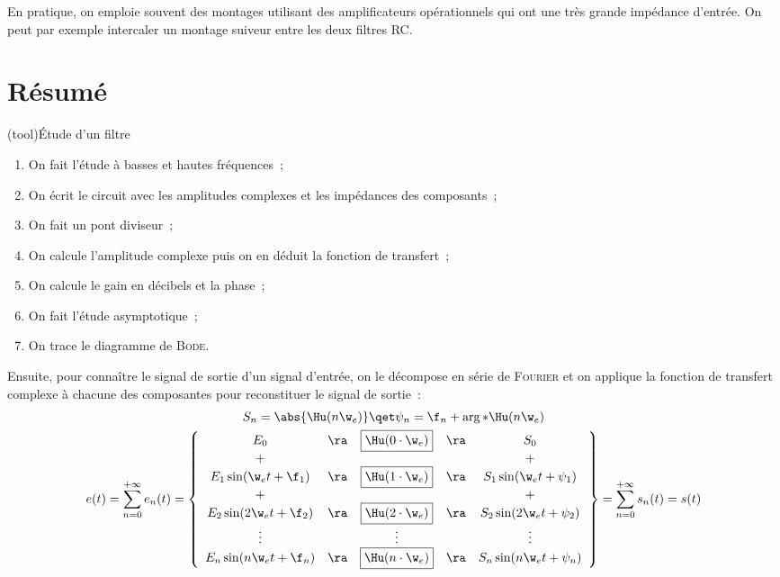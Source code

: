 \documentclass[../../main/main.tex]{subfiles}
\begin{document}
En pratique, on emploie souvent des montages utilisant des amplificateurs
opérationnels qui ont une très grande impédance d'entrée. On peut par exemple
intercaler un montage suiveur entre les deux filtres RC.

\section{Résumé}
\begin{tcb*}[breakable](tool){Étude d'un filtre}
	\begin{enumerate}
		\item On fait l'étude à basses et hautes fréquences~;
		\item On écrit le circuit avec les amplitudes complexes et les impédances des
		      composants~;
		\item On fait un pont diviseur~;
		\item On calcule l'amplitude complexe puis on en déduit la fonction de
		      transfert~;
		\item On calcule le gain en décibels et la phase~;
		\item On fait l'étude asymptotique~;
		\item On trace le diagramme de \textsc{Bode}.
	\end{enumerate}
	Ensuite, pour connaître le signal de sortie d'un signal d'entrée, on le
	décompose en série de \textsc{Fourier} et on applique la fonction de transfert
	complexe à chacune des composantes pour reconstituer le signal de sortie~:
	\begin{gather*}
		S_n = \abs{\Hu(n\w_e)}
		\qet
		\psi_n = \f_n + \arg*{\Hu(n\w_e)}
		\\
		e(t) = \sum_{n=0}^{+\infty} e_n(t) =
		\left\{
		\begin{array}{ccccc}
			E_0                     & \ra & \fbox{$\Hu(0\cdot\w_e)$} & \ra & S_0
			\\
			+                       &     &                          &     & +
			\\
			E_1\sin(\w_e t + \f_1)  & \ra & \fbox{$\Hu(1\cdot\w_e)$} & \ra & S_1\sin(\w_e t + \psi_1)
			\\
			+                       &     &                          &     & +
			\\
			E_2\sin(2\w_e t + \f_2) & \ra & \fbox{$\Hu(2\cdot\w_e)$} & \ra & S_2\sin(2\w_e t + \psi_2)
			\\
			\vdots                  &     & \vdots                   &     & \vdots
			\\
			E_n\sin(n\w_e t + \f_n) & \ra & \fbox{$\Hu(n\cdot\w_e)$} & \ra & S_n\sin(n\w_e t + \psi_n)
		\end{array}
		\right\}
		= \sum_{n=0}^{+\infty}s_n(t)
		= s(t)
	\end{gather*}
\end{tcb*}

\vspace*{-15pt}
\end{document}
